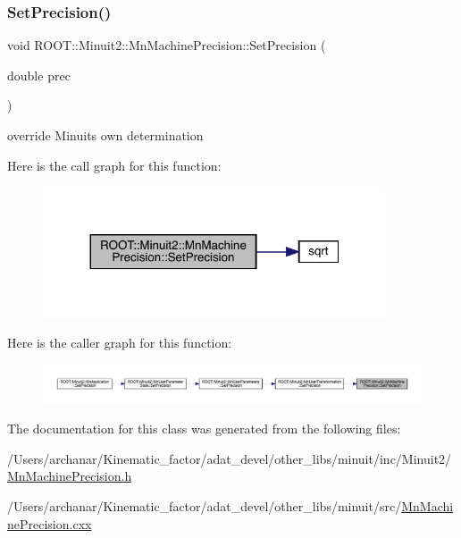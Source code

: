 \subsubsection{\texorpdfstring{SetPrecision()}{SetPrecision()}\hspace{0.1cm}{\footnotesize\ttfamily [2/2]}}
{\footnotesize\ttfamily void R\+O\+O\+T\+::\+Minuit2\+::\+Mn\+Machine\+Precision\+::\+Set\+Precision (\begin{DoxyParamCaption}\item[{double}]{prec }\end{DoxyParamCaption})\hspace{0.3cm}{\ttfamily [inline]}}



override Minuit\textquotesingle{}s own determination 

Here is the call graph for this function\+:
\nopagebreak
\begin{figure}[H]
\begin{center}
\leavevmode
\includegraphics[width=287pt]{d4/d40/classROOT_1_1Minuit2_1_1MnMachinePrecision_a625938e3c6362a06d09fc76e59f366b6_cgraph}
\end{center}
\end{figure}
Here is the caller graph for this function\+:\nopagebreak
\begin{figure}[H]
\begin{center}
\leavevmode
\includegraphics[width=350pt]{d4/d40/classROOT_1_1Minuit2_1_1MnMachinePrecision_a625938e3c6362a06d09fc76e59f366b6_icgraph}
\end{center}
\end{figure}


The documentation for this class was generated from the following files\+:\begin{DoxyCompactItemize}
\item 
/\+Users/archanar/\+Kinematic\+\_\+factor/adat\+\_\+devel/other\+\_\+libs/minuit/inc/\+Minuit2/\mbox{\hyperlink{other__libs_2minuit_2inc_2Minuit2_2MnMachinePrecision_8h}{Mn\+Machine\+Precision.\+h}}\item 
/\+Users/archanar/\+Kinematic\+\_\+factor/adat\+\_\+devel/other\+\_\+libs/minuit/src/\mbox{\hyperlink{MnMachinePrecision_8cxx}{Mn\+Machine\+Precision.\+cxx}}\end{DoxyCompactItemize}
